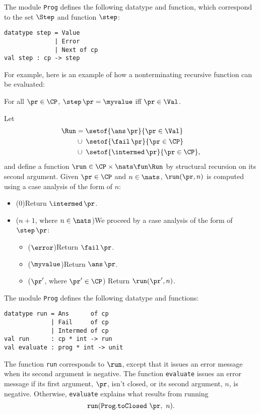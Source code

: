 The module \texttt{Prog} defines the following datatype and function,
which correspond to the set $\Step$ and function $\step$:
\begin{verbatim}
datatype step = Value
              | Error
              | Next of cp
val step : cp -> step
\end{verbatim}
For example, here is an example of how a nonterminating recursive
function can be evaluated:


\begin{proposition}
For all $\pr\in\CP$, $\step\,\pr = \myvalue$ iff $\pr\in\Val$.
\end{proposition}

Let
\begin{align*}
  \Run &= \setof{\ans\,\pr}{\pr\in\Val} \\
  &\cup \;\setof{\fail\,\pr}{\pr\in\CP} \\
  &\cup \;\setof{\intermed\,\pr}{\pr\in\CP} ,
\end{align*}
and define a function $\run\in\CP\times\nats\fun\Run$ by
structural recursion on its second argument.  Given $\pr\in\CP$ and
$n\in\nats$, $\run(\pr,n)$ is computed using a case analysis of
the form of $n$:
\begin{itemize}
\item ($0$)\quad Return $\intermed\,\pr$.

\item ($n + 1$, where $n\in\nats$)\quad We proceed by a case analysis
  of the form of $\step\,\pr$:
  \begin{itemize}
  \item ($\error$)\quad Return $\fail\,\pr$.

  \item ($\myvalue$)\quad Return $\ans\,\pr$.

  \item ($\next\,\pr'$, where $\pr'\in\CP$)\quad
    Return $\run(\pr', n)$.
  \end{itemize}
\end{itemize}

The module \texttt{Prog} defines the following datatype and functions:
\begin{verbatim}
datatype run = Ans      of cp
             | Fail     of cp
             | Intermed of cp
val run      : cp * int -> run
val evaluate : prog * int -> unit
\end{verbatim}
The function \texttt{run} corresponds to $\run$, except that it issues
an error message when its second argument is negative.  The function
\texttt{evaluate} issues an error message if its first argument,
$\pr$, isn't closed, or its second argument, $n$, is negative.
Otherwise, \texttt{evaluate} explains what results from running
\begin{displaymath}
  \mathtt{run}(\mathtt{Prog.toClosed}~\pr,~n).
\end{displaymath}

